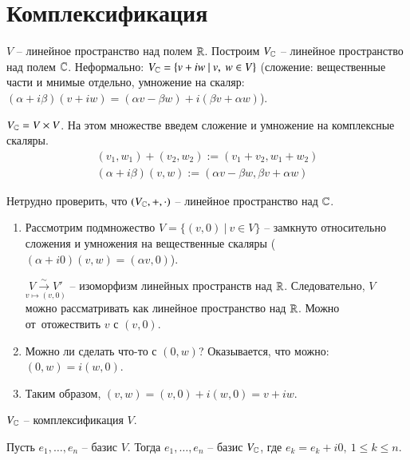 \documentclass[main]{subfiles}
\begin{document}
\chapter{Комплексификация}


$V$ -- линейное пространство над полем $\mathbb{R}$. Построим $V_{\mathbb{C}}$ -- линейное пространство над
полем $\mathbb{C}$. Неформально: $V_{\mathbb{C}} = \{v +  iw \ | \ v, \ w \in V\}$ (сложение: вещественные части и мнимые отдельно, 
умножение на скаляр: $(\alpha + i\beta) (v + iw) = (\alpha v - \beta w) + i(\beta v + \alpha w)$).

$V_{\mathbb{C}} = V\times V$. На этом множестве введем сложение и умножение на комплексные скаляры.
\begin{gather*}
    (v_1,w_1) + (v_2, w_2) := (v_1 + v_2, w_1 + w_2)  \\
    (\alpha + i\beta) (v, w) := (\alpha v - \beta w, \beta v + \alpha w)
\end{gather*}

Нетрудно проверить, что $(V_{\mathbb{C}}, +, \cdot)$ -- линейное пространство над $\mathbb{C}$.

\begin{enumerate}
    \item Рассмотрим подмножество $V = \{(v, 0) \ | \ v \in V\}$ -- 
    замкнуто относительно сложения и умножения на вещественные скаляры 
    ($(\alpha + i0)(v, w) = (\alpha v, 0)$).
    
    $\underset{v \mapsto (v, 0)}{V \xrightarrow{\sim} V'}$ -- изоморфизм линейных пространств над $\mathbb{R}$. Следовательно, 
    $V$ можно рассматривать как линейное пространство над $\mathbb{R}$. Можно от отожествить $v$ с $(v, 0)$.
    \item Можно ли сделать что-то с $(0, w)$? Оказывается, что можно: $(0, w) = i(w, 0)$.
    \item Таким образом, $(v, w) = (v, 0) + i(w, 0) = v +iw$.
\end{enumerate}

$V_{\mathbb{C}}$ -- комплексификация $V$.

\begin{corollary}
    Пусть $e_1, \ldots, e_n$ -- базис $V$. Тогда $e_1, \ldots, e_n$ -- базис $V_{\mathbb{C}}$, где $e_k = e_k + i0, \ 1 \leqslant k\leqslant n $.
\end{corollary}
\end{document}
